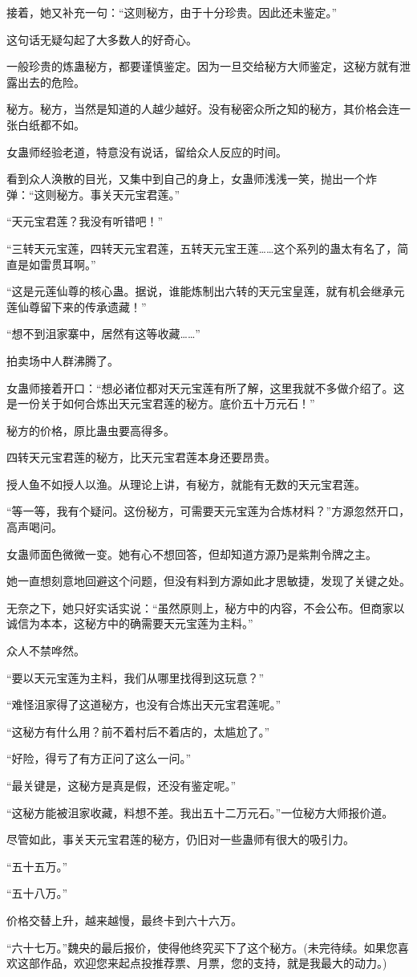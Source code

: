 \begin{this_body}
接着，她又补充一句：“这则秘方，由于十分珍贵。因此还未鉴定。”

这句话无疑勾起了大多数人的好奇心。

一般珍贵的炼蛊秘方，都要谨慎鉴定。因为一旦交给秘方大师鉴定，这秘方就有泄露出去的危险。

秘方。秘方，当然是知道的人越少越好。没有秘密众所之知的秘方，其价格会连一张白纸都不如。

女蛊师经验老道，特意没有说话，留给众人反应的时间。

看到众人涣散的目光，又集中到自己的身上，女蛊师浅浅一笑，抛出一个炸弹：“这则秘方。事关天元宝君莲。”

“天元宝君莲？我没有听错吧！”

“三转天元宝莲，四转天元宝君莲，五转天元宝王莲……这个系列的蛊太有名了，简直是如雷贯耳啊。”

“这是元莲仙尊的核心蛊。据说，谁能炼制出六转的天元宝皇莲，就有机会继承元莲仙尊留下来的传承遗藏！”

“想不到沮家寨中，居然有这等收藏……”

拍卖场中人群沸腾了。

女蛊师接着开口：“想必诸位都对天元宝莲有所了解，这里我就不多做介绍了。这是一份关于如何合炼出天元宝君莲的秘方。底价五十万元石！”

秘方的价格，原比蛊虫要高得多。

四转天元宝君莲的秘方，比天元宝君莲本身还要昂贵。

授人鱼不如授人以渔。从理论上讲，有秘方，就能有无数的天元宝君莲。

“等一等，我有个疑问。这份秘方，可需要天元宝莲为合炼材料？”方源忽然开口，高声喝问。

女蛊师面色微微一变。她有心不想回答，但却知道方源乃是紫荆令牌之主。

她一直想刻意地回避这个问题，但没有料到方源如此才思敏捷，发现了关键之处。

无奈之下，她只好实话实说：“虽然原则上，秘方中的内容，不会公布。但商家以诚信为本本，这秘方中的确需要天元宝莲为主料。”

众人不禁哗然。

“要以天元宝莲为主料，我们从哪里找得到这玩意？”

“难怪沮家得了这道秘方，也没有合炼出天元宝君莲呢。”

“这秘方有什么用？前不着村后不着店的，太尴尬了。”

“好险，得亏了有方正问了这么一问。”

“最关键是，这秘方是真是假，还没有鉴定呢。”

“这秘方能被沮家收藏，料想不差。我出五十二万元石。”一位秘方大师报价道。

尽管如此，事关天元宝君莲的秘方，仍旧对一些蛊师有很大的吸引力。

“五十五万。”

“五十八万。”

价格交替上升，越来越慢，最终卡到六十六万。

“六十七万。”魏央的最后报价，使得他终究买下了这个秘方。(未完待续。如果您喜欢这部作品，欢迎您来起点投推荐票、月票，您的支持，就是我最大的动力。)

\end{this_body}

